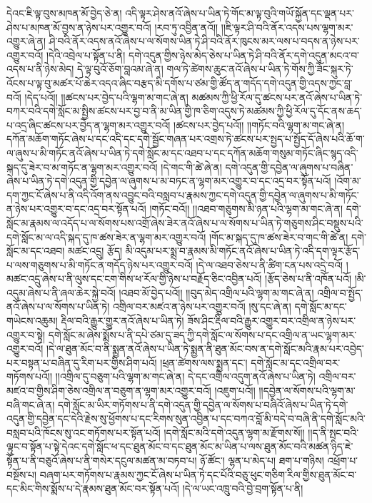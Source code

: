 དེའང་ཇི་ལྟ་བུས་མཁན་མོ་བྱེད་ཅེ་ན། འདི་ལྟར་ཤེས་ནའོ་ཞེས་པ་ཡིན་ཏེ་གོང་མ་ལྟ་བུའི་གཡོ་སྐྱོན་དང་ལྡན་པར་ཤེས་པ་མཁན་མོ་བྱས་ན་ཉེས་པར་འགྱུར་བའོ། །རབ་ཏུ་འབྱིན་ནའོ།། །།ཇི་ལྟར་ཤི་བའི་ནོར་འདས་པས་ལྷག་མར་འགྱུར་ཞེ་ན། ཤི་བའི་ནོར་འདས་ནའོ་ཞེས་པ་ལ་སོགས་ཡིན་ཏེ་ཤི་བའི་ནོར་ཁུངས་མར་ལས་པ་བདས་ན་ཉེས་པར་འགྱུར་བའོ། །དེའི་འབྲེལ་པ་སྟོན་པ་ནི། དགེ་འདུན་གྱིས་ཉེས་མེད་ཅེས་པ་ཡིན་ཏེ་ཤི་བའི་ནོར་དགེ་འདུན་མངའ་བ་འདས་པ་ནི་ཉེས་མེད། དེ་ལྟ་བུའོ་ཅོག་བླའམ་ཞེ་ན། གལ་ཏེ་ཚེགས་ཆུང་ནའོ་ཞེས་པ་ཡིན་ཏེ་གོས་ཀྱི་ཟོང་སྐུར་ཏེ་འོངས་པ་ལྟ་བུ་མཚར་པོ་ཆེར་འདའ་ཞིང་བརྩད་མི་དགོས་པ་ཙམ་གྱི་ཚོད་ན་གདོད་དགེ་འདུན་གྱི་འདས་ཀྱང་བླ་བའོ། །དེད་པའོ།། །།ཚངས་པར་བྱེད་པའི་ལྷག་མ་གང་ཞེ་ན། མཚམས་ཀྱི་ཕྱི་རོལ་དུ་ཚངས་པར་ནའོ་ཞེས་པ་ཡིན་ཏེ་བཀར་བའི་དགེ་སློང་མ་སྤྱིས་ཚངས་པར་བྱ་བ་ནི་མ་ཡིན་གྱི་ཁ་ཅིག་འདུས་ཏེ་མཚམས་ཀྱི་ཕྱི་རོལ་དུ་དོང་ནས་ཆད་པ་འདྲ་ཞིང་ཚངས་པར་བྱེད་ན་ལྷག་མར་འགྱུར་བའོ། །ཚངས་པར་བྱེད་པའོ།། །།གཏོང་བའི་ལྷག་མ་གང་ཞེ་ན། དཀོན་མཆོག་གཏོང་ཞེས་པ་དང་འདི་དང་དགེ་སྦྱོང་གཞན་པར་འགྲས་ཏེ་ཚངས་པར་སྤྱད་པ་སྤྱོད་དོ་ཞེས་པའི་ཆོ་ག་ལ་ཞུས་པ་མི་གཏོང་ནའོ་ཞེས་པ་ཡིན་ཏེ་དགེ་སློང་མ་དང་འཐབ་པ་དང་དཀོན་མཆོག་གསུམ་གཏོང་ཞིང་སྙད་འདི་སྐད་དུ་ཟེར་བ་མ་གཏོང་ན་ལྷག་མར་འགྱུར་བའོ། །དེ་གང་གི་ཚེ་ཞེ་ན། དགེ་འདུན་གྱི་དབྱེན་ལ་ཞུགས་པ་བཞིན་ཞེས་པ་ཡིན་ཏེ་དགེ་འདུན་གྱི་དབྱེན་ལ་ཞུགས་པ་མ་བཏང་ན་ལྷག་མར་འགྱུར་བ་དང་འདྲ་བར་སྟོན་པའོ། །འོག་མ་དག་ཀྱང་ངོ་ཞེས་པ་ནི་འདི་འོག་ནས་འབྱུང་བའི་བསླབ་པ་རྣམས་ཀྱང་དགེ་འདུན་གྱི་དབྱེན་ལ་ཞུགས་པ་མི་གཏོང་ན་ཉེས་པར་འགྱུར་བ་དང་འདྲ་བར་སྟོན་པའོ། །གཏོང་བའོ།། །།འཐབ་གཅུགས་མི་ཉན་པའི་ལྷག་མ་གང་ཞེ་ན། དགེ་སློང་མ་རྣམས་ལ་འདོད་པ་ལ་སོགས་པས་འགྲོ་ཞེས་ཟེར་ནའོ་ཞེས་པ་ལ་སོགས་པ་ཡིན་ཏེ་གཅུགས་ཤིང་བསྡུས་པའི་དགེ་སློང་མ་ལ་འདི་སྐད་དུ་ཁ་ཚས་ཟེར་ན་ལྷག་མར་འགྱུར་བའོ། །གོང་མ་སྐད་དུ་ཁ་ཚས་ཟེར་བ་གང་གི་ཚེ་ན། དགེ་སློང་མ་དང་འཐབ། མཚང་འདྲུ། རྩོད། མི་འདུམ་པར་སྨྲ་བ་རྣམས་མི་གཏོང་ནའོ་ཞེས་པ་ཡིན་ཏེ་འདི་དག་ལྟར་རྩོད་པ་ལས་གཅུགས་པ་མི་གཏོང་ན་གདོད་ཉེས་པར་འགྱུར་བའོ། །དེ་ལ་འཐབ་ཅེས་པ་ནི་ཚིག་ངན་པས་འདྲེ་བའོ། །མཚང་འདྲུ་ཞེས་པ་ནི་ལུས་དང་ངག་གིས་ཕ་རོལ་གྱི་ཉེས་པ་བརྗོད་ཅིང་འབྱིན་པའོ། །རྩོད་ཅེས་པ་ནི་འཁོན་པའོ། །མི་འདུམ་ཞེས་པ་ནི་ཞལ་ཆེར་སྐྱེ་བའོ། །འཐབ་མོ་བྱེད་པའོ།། །།བུད་མེད་འགྲིལ་པའི་ལྷག་མ་གང་ཞེ་ན། འགྲིལ་བ་སྤྱོད་ནའོ་ཞེས་པ་ལ་སོགས་པ་ཡིན་ཏེ། འགྲིལ་བར་མཛའ་ན་ཉེས་པར་འགྱུར་བའོ། །སུ་དང་ཞེ་ན། དགེ་སློང་མ་དང་གཡེངས་འཆུམ། རྡིལ་བའི་རྒྱུར་གྱུར་ནའོ་ཞེས་པ་ཡིན་ཏེ། ཟོས་ཤིང་རྡིལ་བའི་རྒྱུར་འགྱུར་བར་འགྲིལ་ན་ཉེས་པར་འགྱུར་བ་སྟེ། དགེ་སློང་མ་ཞེས་སྨོས་པ་ནི་དཔེ་ཙམ་དུ་ཟད་ཀྱི་དགེ་སློང་ལ་སོགས་པ་དང་འགྲིལ་ན་ཡང་ལྷག་མར་འགྱུར་བའོ། །དེ་ལ་ཐུན་མོང་བ་ནི་སྨྱན་ནའོ་ཞེས་པ་ཡིན་ཏེ་སྨྱན་ནི་ཐུན་མོང་བས་ན་དགེ་སློང་མའི་རྣམ་པར་འབྱེད་པར་བསྟན་པ་བཞིན་དུ་རིག་པར་གྱིས་ཤིག་པའོ། །ཕྲན་ཚེགས་ལས་སྨྱན་དང་། དགེ་སློང་མ་དང་འགྲིལ་བར་གཏོགས་པའོ།། །།འགྲིལ་དུ་བཅུག་པའི་ལྷག་མ་གང་ཞེ་ན། དེ་དང་འགྲིལ་འདུག་ནའོ་ཞེས་པ་ཡིན་ཏེ། འགྲིལ་བར་མཛའ་བ་གྱིས་ཤིག་ཅེས་འགྲིལ་ན་བཅུག་ན་ལྷག་མར་འགྱུར་བའོ། །འཇུག་པའོ།། །།དབྱེན་ལ་སོགས་པའི་ལྷག་མ་བཞི་གང་ཞེ་ན། དགེ་སློང་མ་ཡིར་གཏོགས་པ་ནི་དགེ་འདུན་གྱི་དབྱེན་ལ་སོགས་པ་བཞིའོ་ཞེས་པ་ཡིན་ཏེ་དགེ་འདུན་གྱི་དབྱེན་དང་དེའི་རྗེས་སུ་ཕྱོགས་པ་དང་རིགས་སུན་འབྱིན་པ་དང་བཀའ་བློ་མི་བདེ་བ་བཞི་ནི་དགེ་སློང་མའི་བསླབ་པའི་ཁོངས་སུ་འང་གཏོགས་པར་སྟོན་པའོ། །དགེ་སློང་མའི་དགེ་འདུན་ལྷག་མ་རྫོགས་སོ།། །།ད་ནི་སྤང་བའི་ལྟུང་བ་སྟོན་པ་སྟེ་དེའང་དགེ་སློང་ཕ་དང་ཐུན་མོང་བ་དང་ཐུན་མོང་མ་ཡིན་པ་ལས་ཐུན་མོང་བའི་མཚན་ཉིད་ཇེ་སྟོན་པ་ནི་བཅུའོ་ཞེས་པ་ནི་གསེར་དངུལ་མཚན་མ་བཏབ་པ། ཉོ་ཚོང་། ལྷན་པ་མེད་པ། ཐག་པ་གཉིས། འཕྲོག་པ་བསྔོས་པ། བཞག་པར་གཏོགས་པ་རྣམས་ཀྱང་ངོ་ཞེས་པ་ཡིན་ཏེ་དང་པོའི་བཅུ་ཕུང་གཅིག་རིལ་གྱིས་ཐུན་མོང་བ་དང་མིང་གིས་སྨོས་པ་དེ་རྣམས་ཐུན་མོང་བར་སྟོན་པའོ། །དེ་ལ་ཡང་འཁྲུ་བའི་བྱེ་བྲག་སྟོན་པ་ནི། 
